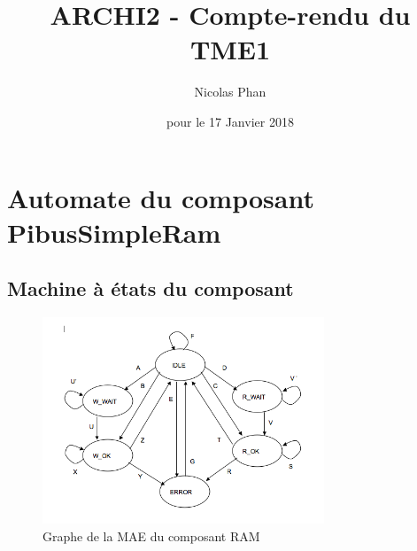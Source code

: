 \documentclass{article}
\title{ARCHI2 - Compte-rendu du TME1}
\author{Nicolas Phan}
\date{pour le 17 Janvier 2018}
\begin{document}
\pagestyle{headings}
\maketitle
\tableofcontents
\newpage



\section{Automate du composant PibusSimpleRam}

\subsection{Machine à états du composant}

\begin{figure}[H]
\includegraphics[width=0.75\textwidth]{pics/mae_ram.png}
\centering
\caption{Graphe de la MAE du composant RAM}
\label{mae_ram}
\end{figure}
\end{document}
